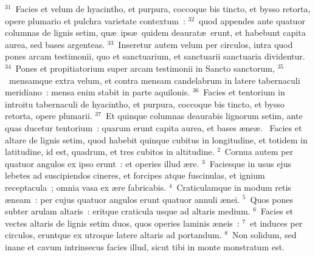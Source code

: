 ${}^{31}$~Facies et velum de hyacintho, et purpura, coccoque bis tincto, et bysso retorta, opere plumario et pulchra varietate contextum~:
${}^{32}$~quod appendes ante quatuor columnas de lignis setim, qu\ae\ ips\ae\ quidem deaurat\ae\ erunt, et habebunt capita aurea, sed bases argenteas.
${}^{33}$~Inseretur autem velum per circulos, intra quod pones arcam testimonii, quo et sanctuarium, et sanctuarii sanctuaria dividentur.
${}^{34}$~Pones et propitiatorium super arcam testimonii in Sancto sanctorum,
${}^{35}$~mensamque extra velum, et contra mensam candelabrum in latere tabernaculi meridiano~: mensa enim stabit in parte aquilonis.
${}^{36}$~Facies et tentorium in introitu tabernaculi de hyacintho, et purpura, coccoque bis tincto, et bysso retorta, opere plumarii.
${}^{37}$~Et quinque columnas deaurabis lignorum setim, ante quas ducetur tentorium~: quarum erunt capita aurea, et bases \ae ne\ae .
~Facies et altare de lignis setim, quod habebit quinque cubitus in longitudine, et totidem in latitudine, id est, quadrum, et tres cubitos in altitudine.
${}^{2}$~Cornua autem per quatuor angulos ex ipso erunt~: et operies illud \ae re.
${}^{3}$~Faciesque in usus ejus lebetes ad suscipiendos cineres, et forcipes atque fuscinulas, et ignium receptacula~; omnia vasa ex \ae re fabricabis.
${}^{4}$~Craticulamque in modum retis \ae neam~: per cujus quatuor angulos erunt quatuor annuli \ae nei.
${}^{5}$~Quos pones subter arulam altaris~: eritque craticula usque ad altaris medium.
${}^{6}$~Facies et vectes altaris de lignis setim duos, quos operies laminis \ae neis~:
${}^{7}$~et induces per circulos, eruntque ex utroque latere altaris ad portandum.
${}^{8}$~Non solidum, sed inane et cavum intrinsecus facies illud, sicut tibi in monte monstratum est.


